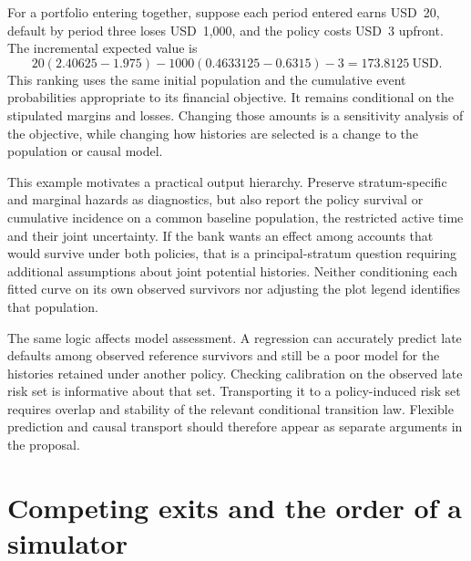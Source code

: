 For a portfolio entering together, suppose each period entered earns USD~20,
default by period three loses USD~1,000, and the policy costs USD~3 upfront.
The incremental expected value is
\begin{equation}
 20(2.40625-1.975)
 -1000(0.4633125-0.6315)-3
 =173.8125\ \mathrm{USD}.
 \label{exec17:s5-selection-value}
\end{equation}
This ranking uses the same initial population and the cumulative event
probabilities appropriate to its financial objective. It remains conditional
on the stipulated margins and losses. Changing those amounts is a sensitivity
analysis of the objective, while changing how histories are selected is a
change to the population or causal model.\citep{exec17_s5_math}

This example motivates a practical output hierarchy. Preserve stratum-specific
and marginal hazards as diagnostics, but also report the policy survival or
cumulative incidence on a common baseline population, the restricted active
time and their joint uncertainty. If the bank wants an effect among accounts
that would survive under both policies, that is a principal-stratum question
requiring additional assumptions about joint potential histories. Neither
conditioning each fitted curve on its own observed survivors nor adjusting
the plot legend identifies that population.

The same logic affects model assessment. A regression can accurately predict
late defaults among observed reference survivors and still be a poor model
for the histories retained under another policy. Checking calibration on the
observed late risk set is informative about that set. Transporting it to a
policy-induced risk set requires overlap and stability of the relevant
conditional transition law. Flexible prediction and causal transport should
therefore appear as separate arguments in the proposal.

\section{Competing exits and the order of a simulator}
\label{exec17:s5-ordered}


